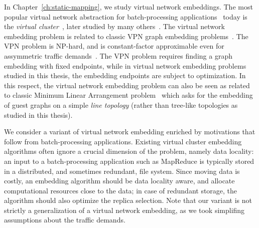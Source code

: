 In Chapter~\ref{ch:static-mapping}, we study virtual network embeddings.
The most popular virtual network abstraction for batch-processing applications~\cite{mapreduce} today is the \emph{virtual cluster}~\cite{oktopus}, later studied by many others~\cite{talk-about,infocom16,ccr15emb,proteus}.
The virtual network embedding problem is related to classic VPN graph embedding problems~\cite{vpn1, vpn2, Goyal2008,gupta2001provisioning}.
The VPN problem is NP-hard, and is constant-factor approximable even for assymmetric traffic demands~\cite{vpn-apx}.
The VPN problem requires finding a graph embedding with fixed endpoints, while in virtual network embedding problems studied in this thesis, the embedding endpoints are subject to optimization.
In this respect, the virtual network embedding problem can also be seen as related to
classic Minimum Linear Arrangement problem~\cite{EvNaRS99,ord-prob} which asks for the
embedding of guest graphs on a simple \emph{line topology} (rather than tree-like topologies as
studied in this thesis).

We consider a variant of virtual network embedding enriched by motivations that follow from batch-processing applications.
Existing virtual cluster embedding algorithms often ignore a crucial dimension of the problem, namely data locality:
an input to a batch-processing application such as MapReduce is typically stored in a distributed,
and sometimes redundant, file system. Since moving
data is costly, an embedding algorithm should be data locality aware,
and allocate computational resources close to the data; in case of redundant storage, the algorithm should also optimize the replica selection.
Note that our variant is not strictly a generalization of a virtual network embedding, as we took simplifing assumptions about the traffic demands.

\medskip

